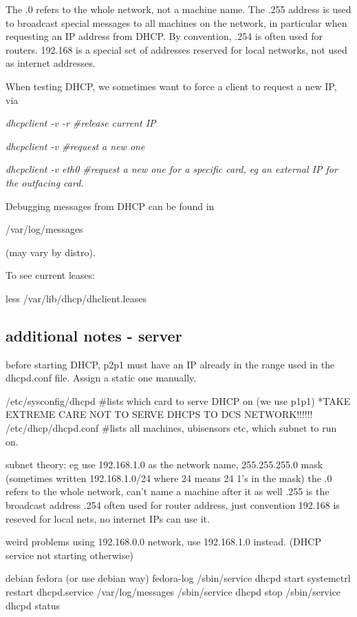 \documentclass[oneside,english]{scrbook}
\begin{document}
The .0 refers to the whole network, not a machine name. The .255 address
is used to broadcast special messages to all machines on the network,
in particular when requesting an IP address from DHCP. By convention,
.254 is often used for routers. 192.168 is a special set of addresses
reserved for local networks, not used as internet addresses.

When testing DHCP, we sometimes want to force a client to request
a new IP, via

\emph{dhcpclient -v -r \#release current IP}

\emph{dhcpclient -v \#request a new one}

\emph{dhcpclient -v eth0 \#request a new one for a specific card,
eg an external IP for the outfacing card.}

Debugging messages from DHCP can be found in

/var/log/messages

(may vary by distro).

To see current leases:

less /var/lib/dhcp/dhclient.leases

\subsection{additional notes - server}

before starting DHCP, p2p1 must have an IP already in the range used in the dhcpd.conf file.  Assign a static one manually.

/etc/sysconfig/dhcpd #lists which card to serve DHCP on (we use p1p1)   *TAKE EXTREME CARE NOT TO SERVE DHCPS TO DCS NETWORK!!!!!!
/etc/dhcp/dhcpd.conf   #lists all machines, ubisensors etc, which subnet to run on.

subnet theory:
    eg use 192.168.1.0 as the network name, 255.255.255.0 mask    (sometimes written 192.168.1.0/24 where 24 means 24 1's in the mask)
    the .0 refers to the whole network, can't name a machine after it as well
    .255 is the broadcast address
    .254 often used for router address, just convention
    192.168 is reseved for local nets, no internet IPs can use it.

weird problems using 192.168.0.0 network, use 192.168.1.0 instead. (DHCP service not starting otherwise)

  debian                fedora  (or use debian way)             fedora-log
/sbin/service dhcpd start       systemctrl restart dhcpd.service    /var/log/messages
/sbin/service dhcpd stop
/sbin/service dhcpd status
\end{document}

